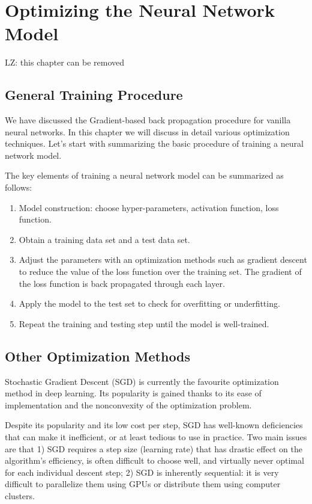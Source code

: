 \chapter{Optimizing the Neural Network Model}
{\color{red}LZ: this chapter can be removed}
\section{General Training Procedure}
We have discussed the Gradient-based back propagation procedure for vanilla neural networks. In this chapter we will discuss in detail various optimization techniques. Let's start with summarizing the basic procedure of training a neural network model.

The key elements of training a neural network model can be summarized as follows: 
\begin{enumerate}
\item Model construction: choose hyper-parameters, activation function, loss function.
\item Obtain a training data set and a test data set.
\item Adjust the parameters with an optimization methods such as gradient descent to reduce the value of the loss function over the training set. The gradient of the loss function is back propagated through each layer.
\item Apply the model to the test set to check for overfitting or underfitting.
\item Repeat the training and testing step until the model is well-trained.
\end{enumerate}





\section{Other Optimization Methods}


Stochastic Gradient Descent (SGD) is currently the favourite optimization method in deep learning. Its popularity is gained thanks to its ease of implementation and the nonconvexity of the optimization problem.

Despite its popularity and its low cost per step, SGD has well-known 
deficiencies that can make it inefficient, or at least tedious to use in 
practice. Two main issues are that 1) SGD requires a step size (learning 
rate) that has drastic effect on the algorithm's efficiency, is often 
difficult to choose well, and virtually never optimal for each individual 
descent step; 2) SGD is inherently sequential: it is very difficult to 
parallelize them using GPUs or distribute them using computer clusters.

